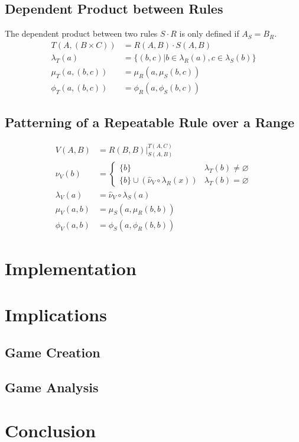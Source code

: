 \documentclass{article}
\theoremstyle{definition}
\theoremstyle{plain}
\begin{document}
\subsection{Dependent Product between Rules}
The dependent product between two rules $ S \cdot R $ is only defined if $ A_S = B_R $.
\begin{align}
          T (A, (B \times C)) & = R (A, B) \cdot S (A, B) \\
  \lambda_T (a)               & = \{ (b,c) | b \in \lambda_R (a), c \in \lambda_S (b) \} \\
      \mu_T (a, (b, c))       & =   \mu_R (a,  \mu_S (b, c)) \\
     \phi_T (a, (b, c))       & =  \phi_R (a, \phi_S (b, c)) 
\end{align}

\subsection{Patterning of a Repeatable Rule over a Range}

\begin{align}
     V (A, B)    & = R (B, B) \bigg\rvert_{S (A, B)}^{T (A, C)} \\
    \nu_V (b)    & = \begin{cases} \{ b \} & \lambda_T (b) \neq \varnothing \\ \{ b \} \cup (\widehat{\nu}_V \circ \lambda_R (x)) & \lambda_T (b) = \varnothing \end{cases} \\
\lambda_V (a)    & = \widehat{\nu}_V \circ \lambda_S (a) \\
    \mu_V (a, b) & =  \mu_S (a,  \mu_R(b, b)) \\
   \phi_V (a, b) & = \phi_S (a, \phi_R(b, b)) 
\end{align}

\section{Implementation}

\section{Implications}

\subsection{Game Creation}

\subsection{Game Analysis}

\section{Conclusion}
\end{document}
